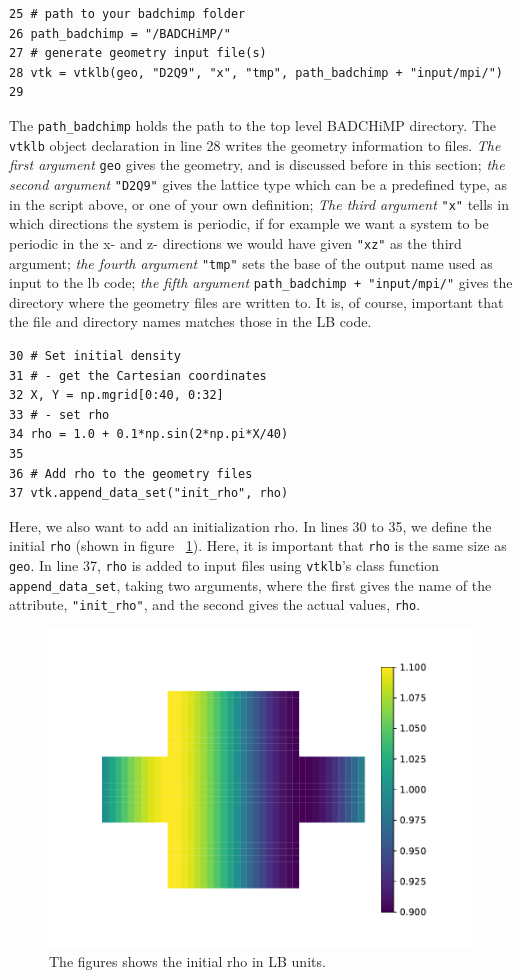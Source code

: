 \documentclass[11pt,a4paper]{report}
\begin{document}
\begin{verbatim} 
25 # path to your badchimp folder
26 path_badchimp = "/BADCHiMP/"
27 # generate geometry input file(s)
28 vtk = vtklb(geo, "D2Q9", "x", "tmp", path_badchimp + "input/mpi/") 
29
\end{verbatim}
The \texttt{path\_badchimp} holds the path to the top level BADCHiMP directory. The \texttt{vtklb} object declaration in line 28 writes the geometry information to files. \emph{The first argument} \texttt{geo} gives the geometry, and is discussed before in this section; \emph{the second argument} \texttt{"D2Q9"} gives the lattice type which can be a predefined type, as in the script above, or one of your own definition; \emph{The third argument} \texttt{"x"} tells in which directions the system is periodic, if for example we want a system to be periodic in the x- and z- directions we would have given \texttt{"xz"} as the third argument; \emph{the fourth argument} \texttt{"tmp"} sets the base of the output name used as input to the lb code; \emph{the fifth argument} \texttt{path\_badchimp + "input/mpi/"} gives the directory where the geometry files are written to. It is, of course, important that the file and directory names matches those in the LB code.  
\begin{verbatim} 
30 # Set initial density
31 # - get the Cartesian coordinates
32 X, Y = np.mgrid[0:40, 0:32]
33 # - set rho
34 rho = 1.0 + 0.1*np.sin(2*np.pi*X/40)
35
36 # Add rho to the geometry files
37 vtk.append_data_set("init_rho", rho)
\end{verbatim} 
Here, we also want to add an initialization rho. In lines 30 to 35, we define the initial \texttt{rho} (shown in figure ~\ref{fig:std_init_rho}). Here, it is important that \texttt{rho} is the same size as \texttt{geo}. In line 37, \texttt{rho} is added to input files using \texttt{vtklb}'s class function \texttt{append\_data\_set}, taking two arguments, where the first gives the name of the attribute, \texttt{"init\_rho"}, and the second gives the actual values, \texttt{rho}.
\begin{figure}
	\centering
	\includegraphics[width=0.7\linewidth]{Figures/std_init_rho.pdf}
	\caption{The figures shows the initial rho in LB units.}
	\label{fig:std_init_rho}
\end{figure} 
\end{document}
